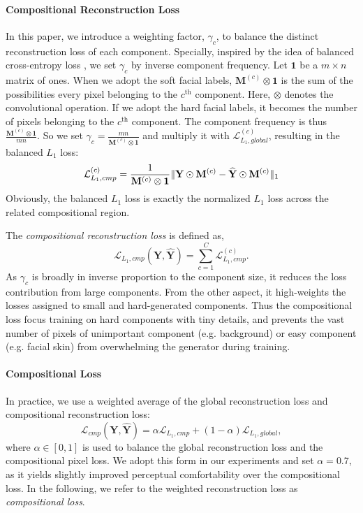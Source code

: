 \documentclass[journal]{IEEEtran}
\begin{document}
\paragraph{Compositional Reconstruction Loss}
In this paper, we introduce a weighting factor, $\gamma_c$, to balance the distinct reconstruction loss of each component. Specially, inspired by the idea of balanced cross-entropy loss \cite{Lin2017Focal}, we set $\gamma_c$ by inverse component frequency. Let $\mathbf{1}$ be a $m \times n$ matrix of ones. When we adopt the soft facial labels, $\mathbf{M}^{(c)} \otimes \mathbf{1}$ is the sum of the possibilities every pixel belonging to the $c^\text{th}$ component. Here, $\otimes$ denotes the convolutional operation. If we adopt the hard facial labels, it becomes the number of pixels belonging to the $c^\text{th}$ component. The component frequency is thus $\frac{\mathbf{M}^{(c)} \otimes \mathbf{1}}{mn}$. So we set $\gamma_c = \frac{mn}{\mathbf{M}^{(c)} \otimes \mathbf{1}}$ and multiply it with $\mathcal{L}_{L_1, global}^{(c)}$, resulting in the balanced $L_1$ loss:
\begin{equation}
\mathcal{L}_{L_1, cmp}^{(c)} = \frac{1}{\mathbf{M}^{(c)} \otimes \mathbf{1} } \Arrowvert \mathbf{Y} \odot \mathbf{M}^{(c)} - \widehat{\mathbf{Y}} \odot \mathbf{M}^{(c)}  \Arrowvert_1
	\label{eq:cmploss}
\end{equation}
Obviously, the balanced $L_1$ loss is exactly the normalized $L_1$ loss across the related compositional region.

The \textit{compositional reconstruction loss} is defined as,
\begin{equation}
\mathcal{L}_{L_1, cmp}(\mathbf{Y}, \widehat{\mathbf{Y}}) = \sum_{c=1}^C{\mathcal{L}_{L_1, cmp}^{(c)}}.
\end{equation}
As $\gamma_c$ is broadly in inverse proportion to the component size, it reduces the loss contribution from large components. From the other aspect, it high-weights the losses assigned to small and hard-generated components. Thus the compositional loss focus training on hard components with tiny details, and prevents the vast number of pixels of unimportant component (e.g. background) or easy component (e.g. facial skin) from overwhelming the generator during training.

\paragraph{Compositional Loss} In practice, we use a weighted average of the global reconstruction loss and compositional reconstruction loss:
\begin{equation}
\mathcal{L}_{cmp}(\mathbf{Y}, \widehat{\mathbf{Y}}) = \alpha \mathcal{L}_{L_1, cmp} + (1-\alpha)\mathcal{L}_{L_1, global},
\end{equation}
where $\alpha \in [0, 1]$ is used to balance the global reconstruction loss and the compositional pixel loss. 
We adopt this form in our experiments and set $\alpha=0.7$, as it yields slightly improved perceptual comfortability over the compositional loss. In the following, we refer to the weighted reconstruction loss as \textit{compositional loss}. 
\end{document}
